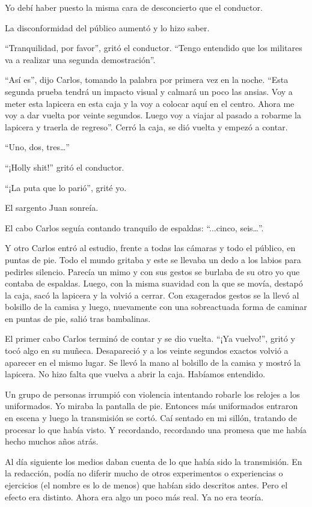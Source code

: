 \documentclass[12pt,twoside,openright]{book}
\begin{document}
Yo debí haber puesto la misma cara de desconcierto que el conductor.

La disconformidad del público aumentó y lo hizo saber.

“Tranquilidad, por favor”, gritó el conductor. “Tengo entendido que los militares va a realizar una segunda demostración”.

“Así es”, dijo Carlos, tomando la palabra por primera vez en la noche. “Esta segunda prueba tendrá un impacto visual y calmará un poco las ansias. Voy a meter esta lapicera en esta caja y la voy a colocar aquí en el centro. Ahora me voy a dar vuelta por veinte segundos. Luego voy a viajar al pasado a robarme la lapicera y traerla de regreso”. Cerró la caja, se dió vuelta y empezó a contar.

“Uno, dos, tres…”

“¡Holly shit!” gritó el conductor.

“¡La puta que lo parió”, grité yo.

El sargento Juan sonreía.

El cabo Carlos seguía contando tranquilo de espaldas: “...cinco, seis…”.

Y otro Carlos entró al estudio, frente a todas las cámaras y todo el público, en puntas de pie. Todo el mundo gritaba y este se llevaba un dedo a los labios para pedirles silencio. Parecía un mimo y con sus gestos se burlaba de su otro yo que contaba de espaldas. Luego, con la misma suavidad con la que se movía, destapó la caja, sacó la lapicera y la volvió a cerrar. Con exagerados gestos se la llevó al bolsillo de la camisa y luego, nuevamente con una sobreactuada forma de caminar en puntas de pie, salió tras bambalinas.

El primer cabo Carlos terminó de contar y se dio vuelta. “¡Ya vuelvo!”, gritó y tocó algo en su muñeca. Desapareció y a los veinte segundos exactos volvió a aparecer en el mismo lugar. Se llevó la mano al bolsillo de la camisa y mostró la lapicera. No hizo falta que vuelva a abrir la caja. Habíamos entendido.

Un grupo de personas irrumpió con violencia intentando robarle los relojes a los uniformados. Yo miraba la pantalla de pie. Entonces más uniformados entraron en escena y luego la transmisión se cortó. Caí sentado en mi sillón, tratando de procesar lo que había visto. Y recordando, recordando una promesa que me había hecho muchos años atrás.

Al día siguiente los medios daban cuenta de lo que había sido la transmisión. En la redacción, podía no diferir mucho de otros experimentos o experiencias o ejercicios (el nombre es lo de menos) que habían sido descritos antes. Pero el efecto era distinto. Ahora era algo un poco más real. Ya no era teoría.
\end{document}
